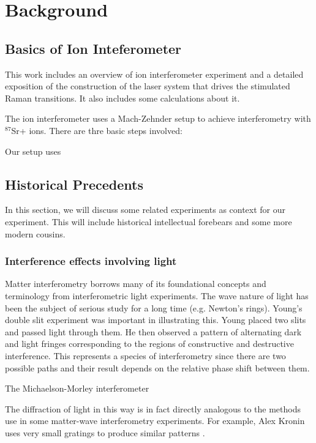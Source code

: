 


\chapter{Background}

\section{Basics of Ion Inteferometer}

This work includes an overview of ion interferometer experiment and a detailed exposition of the construction of the laser system that drives the stimulated Raman transitions. It also includes some calculations about it. 

The ion interferometer uses a Mach-Zehnder setup to achieve interferometry with $^{87}$Sr+ ions. There are thre basic steps involved: 
\begin{itemize}

\end{itemize}



Our setup uses 


\section{Historical Precedents}
In this section, we will discuss some related experiments as context for our experiment. This will include historical intellectual forebears and some more modern cousins. 
 \subsection{Interference effects involving light}
Matter interferometry borrows many of its foundational concepts and terminology from interferometric light experiments. 
The wave nature of light has been the subject of serious study for a long time (e.g. Newton's rings). Young's double slit experiment was important in illustrating this. Young placed two slits and passed light through them. He then observed a pattern of alternating dark and light fringes corresponding to the regions of constructive and destructive interference. This represents a species of interferometry since there are two possible paths and their result depends on the relative phase shift between them. 

The Michaelson-Morley interferometer 


The diffraction of light in this way is in fact directly analogous to the methods use in some matter-wave interferometry experiments. For example, Alex Kronin uses very small gratings to produce similar patterns \cite{Kronin_RMP}. 

